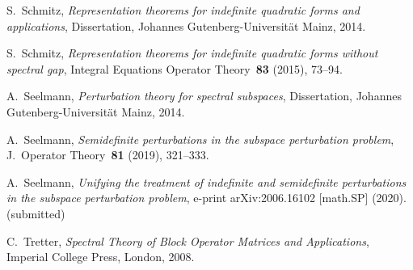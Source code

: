 \documentclass[11pt,a4paper]{amsart}
\numberwithin{equation}{section}
\theoremstyle{plain}
\theoremstyle{definition}
\theoremstyle{remark}
\begin{document}
\begin{thebibliography}{[10]}
   S.~Schmitz,
    \emph{Representation theorems for indefinite quadratic forms and applications},
    Dissertation, Johannes Gutenberg-Universit\"at Mainz, 2014.

   S.~Schmitz,
    \emph{Representation theorems for indefinite quadratic forms without spectral gap},
    Integral Equations Operator Theory~\textbf{83} (2015), 73--94.

   A.~Seelmann,
    \emph{Perturbation theory for spectral subspaces},
    Dissertation, Johannes Gutenberg-Universit\"at Mainz, 2014.

   A.~Seelmann,
    \emph{Semidefinite perturbations in the subspace perturbation problem},
     J.~Operator Theory~\textbf{81} (2019), 321--333.

	 A.~Seelmann,
		\emph{Unifying the treatment of indefinite and semidefinite perturbations in the subspace perturbation problem},
		e-print arXiv:2006.16102 [math.SP] (2020). (submitted)

   C.~Tretter,
    \emph{Spectral Theory of Block Operator Matrices and Applications},
    Imperial College Press, London, 2008.

\end{thebibliography}
\end{document}
